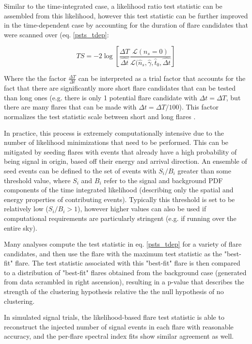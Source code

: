 Similar to the time-integrated case, a likelihood ratio test statistic can be assembled from this likelihood, however this test statistic can be further improved in the time-dependent case by accounting for the duration of flare candidates that were scanned over (eq. \ref{psts_tdep}:

\begin{equation}
    TS = -2 \log [\frac{\Delta T}{\hat{\Delta t}}\frac{\mathcal{L}(n_s=0)}{\mathcal{L}(\hat{n}_s, \hat{\gamma}, \hat{t}_0, \hat{\Delta t}}]
    \label{psts_tdep}
\end{equation}

Where the the factor $\frac{\Delta T}{\Delta t}$ can be interpreted as a trial factor that accounts for the fact that there are significantly more short flare candidates that can be tested than long ones (e.g. there is only 1 potential flare candidate with $\Delta t = \Delta T$, but there are many flares that can be made with $\Delta t = \Delta T/100$). This factor normalizes the test statistic scale between short and long flares \cite{Braun_2010}.

In practice, this process is extremely computationally intensive due to the number of likelihood minimizations that need to be performed. This can be mitigated by seeding flares with events that already have a high probability of being signal in origin, based off their energy and arrival direction. An ensemble of seed events can be defined to the set of events with $S_i/B_i$ greater than some threshold value, where $S_i$ and $B_i$ refer to the signal and background PDF components of the time integrated likelihood (describing only the spatial and energy properties of contributing events). Typically this threshold is set to be relatively low ($S_i/B_i > 1$), however higher values can also be used if computational requirements are particularly stringent (e.g. if running over the entire sky). 

Many analyses compute the test statistic in eq. \ref{psts_tdep} for a variety of flare candidates, and then use the flare with the maximum test statistic as the "best-fit" flare. The test statistic associated with this "best-fit" flare is then compared to a distribution of "best-fit" flares obtained from the background case (generated from data scrambled in right ascension), resulting in a p-value that describes the strength of the clustering hypothesis relative the the null hypothesis of no clustering. 

In simulated signal trials, the likelihood-based flare test statistic is able to reconstruct the injected number of signal events in each flare with reasonable accuracy, and the per-flare spectral index fits show similar agreement as well. 

